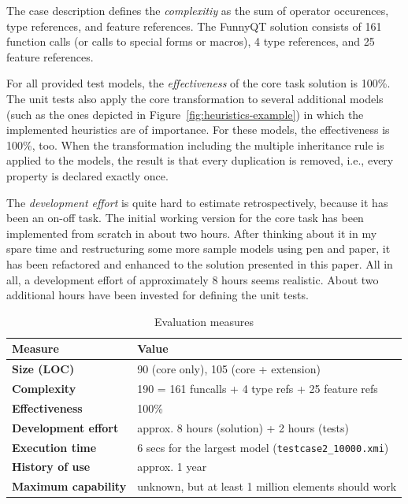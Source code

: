 \documentclass[11pt]{article}
\begin{document}
The case description defines the \emph{complexitiy} as the sum of operator
occurences, type references, and feature references.  The FunnyQT solution
consists of 161 function calls (or calls to special forms or macros), 4 type
references, and 25 feature references.

For all provided test models, the \emph{effectiveness} of the core task
solution is 100\%.  The unit tests also apply the core transformation to
several additional models (such as the ones depicted in
Figure~\ref{fig:heuristics-example}) in which the implemented heuristics are of
importance.  For these models, the effectiveness is 100\%, too.  When the
transformation including the multiple inheritance rule is applied to the
models, the result is that every duplication is removed, i.e., every property
is declared exactly once.

The \emph{development effort} is quite hard to estimate retrospectively,
because it has been an on-off task.  The initial working version for the core
task has been implemented from scratch in about two hours.  After thinking
about it in my spare time and restructuring some more sample models using pen
and paper, it has been refactored and enhanced to the solution presented in
this paper.  All in all, a development effort of approximately 8 hours seems
realistic.  About two additional hours have been invested for defining the unit
tests.

\begin{table}[htb]
  \centering
  \begin{tabular}{| l | l |}
    \hline
    \textbf{Measure}            & \textbf{Value}\\
    \hline
    \textbf{Size (LOC)}         & 90 (core only), 105 (core + extension)\\
    \textbf{Complexity}         & 190 = 161 funcalls + 4 type refs + 25 feature refs\\
    \textbf{Effectiveness}      & 100\%\\
    \textbf{Development effort} & approx. 8 hours (solution) + 2 hours (tests)\\
    \textbf{Execution time}     & 6 secs for the largest model (\verb|testcase2_10000.xmi|)\\
    \textbf{History of use}     & approx. 1 year\\
    \textbf{Maximum capability} & unknown, but at least 1 million elements should work\\
    \hline
  \end{tabular}
  \caption{Evaluation measures}
  \label{tab:evaluation}
\end{table}
\end{document}
